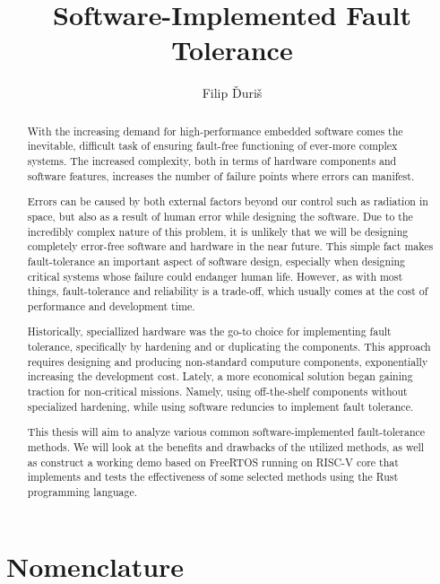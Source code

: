 \documentclass[12pt, letterpaper]{article}
\title{
    \Huge \textbf{Software-Implemented Fault Tolerance}
}
\author{Filip Ďuriš}
\begin{document}



\newpage

\begin{abstract}
With the increasing demand for high-performance embedded software comes the inevitable, difficult task of ensuring fault-free functioning of ever-more complex systems. The increased complexity, both in terms of hardware components and software features, increases the number of failure points where errors can manifest.

Errors can be caused by both external factors beyond our control such as radiation in space, but also as a result of human error while designing the software. Due to the incredibly complex nature of this problem, it is unlikely that we will be designing completely error-free software and hardware in the near future. This simple fact makes fault-tolerance an important aspect of software design, especially when designing critical systems whose failure could endanger human life. However, as with most things, fault-tolerance and reliability is a trade-off, which usually comes at the cost of performance and development time.

Historically, speciallized hardware was the go-to choice for implementing fault tolerance, specifically by hardening and or duplicating the components. This approach requires designing and producing non-standard computure components, exponentially increasing the development cost. Lately, a more economical solution began gaining traction for non-critical missions. Namely, using off-the-shelf components without specialized hardening, while using software reduncies to implement fault tolerance.

This thesis will aim to analyze various common software-implemented fault-tolerance methods. We will look at the benefits and drawbacks of the utilized methods, as well as construct a working demo based on FreeRTOS running on RISC-V core that implements and tests the effectiveness of some selected methods using the Rust programming language.
\end{abstract}

\newpage

\tableofcontents

\newpage

\section{Nomenclature}
\end{document}
